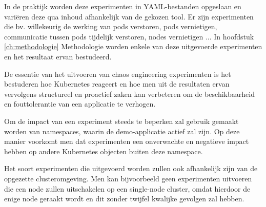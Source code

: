 In de praktijk worden deze experimenten in YAML-bestanden opgeslaan en variëren deze qua inhoud afhankelijk van de gekozen tool. Er zijn experimenten die bv. willekeurig de werking van pods verstoren, pods vernietigen, communicatie tussen pods tijdelijk verstoren, nodes vernietigen ... In hoofdstuk \ref{ch:methodologie} Methodologie worden enkele van deze uitgevoerde experimenten en het resultaat ervan bestudeerd. 

De essentie van het uitvoeren van chaos engineering experimenten is het bestuderen hoe Kubernetes reageert en hoe men uit de resultaten ervan vervolgens structureel en proactief zaken kan verbeteren om de beschikbaarheid en fouttolerantie van een applicatie te verhogen.  

Om de impact van een experiment steeds te beperken zal gebruik gemaakt worden van namespaces, waarin de demo-applicatie actief zal zijn. Op deze manier voorkomt men dat experimenten een onverwachte en negatieve impact hebben op andere Kubernetes objecten buiten deze namespace.

Het soort experimenten die uitgevoerd worden zullen ook afhankelijk zijn van de opgezette clusteromgeving. Men kan bijvoorbeeld geen experimenten uitvoeren die een node zullen uitschakelen op een single-node cluster, omdat hierdoor de enige node geraakt wordt en dit zonder twijfel kwalijke gevolgen zal hebben.    
